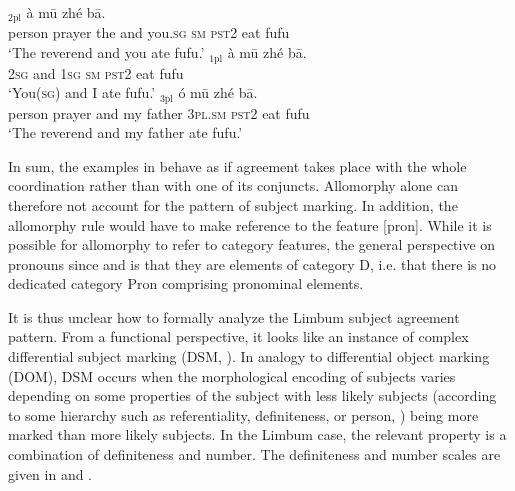\documentclass[output=paper]{langscibook}
\begin{document}
\ea\label{ex:johanneshein:coordination}
\begin{xlist}
\ex \label{ex:johanneshein:conjunct1}
$_{\text{2pl}}$ à mū zhé bā.\\
\hphantom{[}person prayer the and you.\textsc{sg} \textsc{sm} \textsc{pst2} eat fufu\\
\glt `The reverend and you ate fufu.'
\ex \label{ex:johanneshein:conjunct2}
\gll [Wὲ bá mὲ]$_{\text{1pl}}$ à mū zhé bā.\\
\hphantom{[}\textsc{2sg} and \textsc{1sg} \textsc{sm} \textsc{pst2} eat fufu\\
\glt `You(\textsc{sg}) and I ate fufu.'
\ex \label{ex:johanneshein:conjunct3}
$_{\text{3pl}}$ ó mū zhé bā.\\
\hphantom{[}person prayer and my father \textsc{3pl.sm} \textsc{pst2} eat fufu\\
\glt `The reverend and my father ate fufu.'
\end{xlist}
\z
In sum, the examples in  behave as if agreement takes
place with the whole coordination rather than with one of its conjuncts. Allomorphy alone can therefore not account
for the pattern of subject marking. In addition, the allomorphy rule
would have to make reference to the feature [pron]. While it is
possible for allomorphy to refer to category features, the general
perspective on pronouns since \citet{postal69} and \citet{abney87} is
that they are elements of category D, i.e. that there is no dedicated
category Pron comprising pronominal elements.

It is thus unclear how to formally analyze the Limbum subject
agreement pattern.  From a functional perspective, it looks like an
instance of complex differential subject marking (DSM,
\citealp{deHoop+malchukov08}). In analogy to differential object
marking (DOM), DSM occurs when the morphological encoding of subjects
varies depending on some properties of the subject with less likely
subjects (according to some hierarchy such as referentiality,
definiteness, or person, \citealp{hale72,silverstein76}) being more
marked than more likely subjects. In the Limbum case, the relevant
property is a combination of definiteness and number. The definiteness
and number scales are given in  and .
\end{document}
